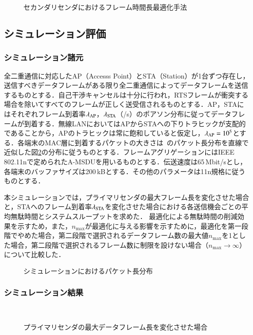 \documentclass[technicalreport]{ieicej}
\begin{document}
	\begin{figure}[t]
		\centering
		\caption{セカンダリセンダにおけるフレーム時間長最適化手法}
		\label{fig:opti}
	\end{figure}

	\subsection{シミュレーション評価}
		\subsubsection{シミュレーション諸元}
		全二重通信に対応したAP（Accesss Point）とSTA（Station）が1台ずつ存在し，送信すべきデータフレームがある限り全二重通信によってデータフレームを送信するものとする．自己干渉キャンセルは十分に行われ，RTSフレームが衝突する場合を除いてすべてのフレームが正しく送受信されるものとする．AP，STAにはそれぞれフレーム到着率$\lambda_{\rm AP}$，$\lambda_{\rm STA}$（/s）のポアソン分布に従ってデータフレームが到着する．無線LANにおいてはAPからSTAへの下りトラヒックが支配的であることから，APのトラヒックは常に飽和していると仮定し，$\lambda_{\rm AP}=10^5$とする．各端末のMAC層に到着するパケットの大きさは~\cite{traffic}のパケット長分布を直線で近似した図\ref{fig:packet}の分布に従うものとする．フレームアグリゲーションにはIEEE 802.11nで定められたA-MSDUを用いるものとする．伝送速度は65\,Mbit/sとし，各端末のバッファサイズは200\,kBとする．その他のパラメータは11n規格に従うものとする．
		\par
		本シミュレーションでは，プライマリセンダの最大フレーム長を変化させた場合と，STAへのフレーム到着率$\lambda_{\rm STA}$を変化させた場合における各送信機会ごとの平均無駄時間とシステムスループットを求めた．
		最適化による無駄時間の削減効果を示すため，また，$n_{\max}$が最適化に与える影響を示すために，最適化を第一段階でやめた場合，第二段階で選択されるデータフレーム数の最大値$n_{\max}$を1とした場合，第二段階で選択されるフレーム数に制限を設けない場合（$n_{\max}\to \infty$）について比較した．

		\begin{figure}[t]
			\centering
			\caption{シミュレーションにおけるパケット長分布}
			\label{fig:packet}
		\end{figure}

		\subsubsection{シミュレーション結果}
		\begin{figure}[t]
			\centering
			\\
			\caption{プライマリセンダの最大データフレーム長を変化させた場合}
			\label{fig:max}
		\end{figure}
\end{document}
